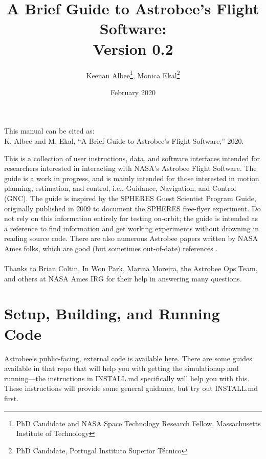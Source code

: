 \documentclass{article}
\begin{document}
\vspace{2in}
\title{A Brief Guide to Astrobee's Flight Software:\\
        Version 0.2}
\author{Keenan Albee\footnote{PhD Candidate and NASA Space Technology Research Fellow, Massachusetts Institute of Technology}, Monica Ekal\footnote{PhD Candidate, Portugal Instituto Superior Técnico}}
\date{February 2020}
\maketitle
\vfill
\begin{center}
This manual can be cited as:\\
K. Albee and M. Ekal, “A Brief Guide to Astrobee’s Flight Software,” 2020.
\end{center}
\newpage
This is a collection of user instructions, data, and software interfaces intended for researchers interested in interacting with NASA's Astrobee Flight Software. The guide is a work in progress, and is mainly intended for those interested in motion planning, estimation, and control, i.e., Guidance, Navigation, and Control (GNC). The guide is inspired by the SPHERES Guest Scientist Program Guide, originally published in 2009 to document the SPHERES free-flyer experiment. Do not rely on this information entirely for testing on-orbit; the guide is intended as a reference to find information and get working experiments without drowning in reading source code. There are also numerous Astrobee papers written by NASA Ames folks, which are good (but sometimes out-of-date) references \cite{Park2017a} \cite{Smith2016} \cite{Watterson2016} \cite{Fluckiger} \cite{Coltin2016a} \cite{Kim2017} \cite{Bualat2015} \cite{Lee2018}.
\\
\\
\indent Thanks to Brian Coltin, In Won Park, Marina Moreira, the Astrobee Ops Team, and others at NASA Ames IRG for their help in answering many questions.
\newpage

\tableofcontents



\newpage

\section{Setup, Building, and Running Code} 

Astrobee's public-facing, external code is available \href{https://github.com/nasa/astrobee}{here}. There are some guides available in that repo that will help you with getting the simulationup and running---the instructions in INSTALL.md specifically will help you with this. These instructions will provide some general guidance, but try out INSTALL.md first.
\end{document}
